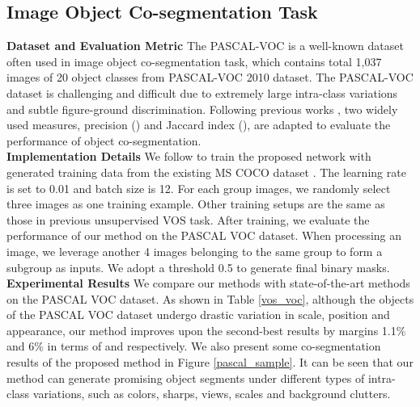 \documentclass[runningheads]{llncs}
\begin{document}
\subsection{Image Object Co-segmentation Task}\label{exp_iocs}
\textbf{Dataset and Evaluation Metric}  The PASCAL-VOC \cite{coseg_faktor13}  is a well-known dataset often used in image object co-segmentation task, which contains total 1,037 images of 20 object classes from PASCAL-VOC 2010 dataset. The PASCAL-VOC dataset is challenging and difficult due to extremely large intra-class variations and subtle figure-ground discrimination.  Following previous works \cite{coseg_faktor13,coseg_lee15,coseg_chang15,coseg_Jerripothula16,coseg_li19}, two widely used measures, precision () and Jaccard index (), are adapted to evaluate the performance of object co-segmentation. \\
\noindent \textbf{Implementation Details} We follow \cite{coseg_groupsem,coseg_li19} to train the proposed network  with generated training data from the existing MS COCO dataset \cite{mscoco}. The learning rate is set to 0.01 and batch size is 12. For each group images, we randomly select three images as one training example. Other training setups are the same as those in previous unsupervised VOS task. After training, we evaluate the performance of our method on the PASCAL VOC dataset. When processing an image, we leverage another 4 images belonging to the same group to form a subgroup as inputs. We adopt a threshold 0.5 to generate final binary  masks.\\
\noindent \textbf{Experimental Results}  We compare our methods with state-of-the-art methods on the PASCAL VOC dataset. As shown in Table \ref{vos_voc}, although the objects of the PASCAL VOC dataset undergo drastic variation in scale, position and appearance, our method improves upon the second-best results \cite{coseg_li19} by margins  1.1\% and 6\% in terms of  and  respectively. We also present some co-segmentation results of the proposed method in Figure \ref{pascal_sample}. It can be seen that our method can generate promising object segments under different types of intra-class variations, such as colors, sharps, views, scales and background clutters.
\end{document}
